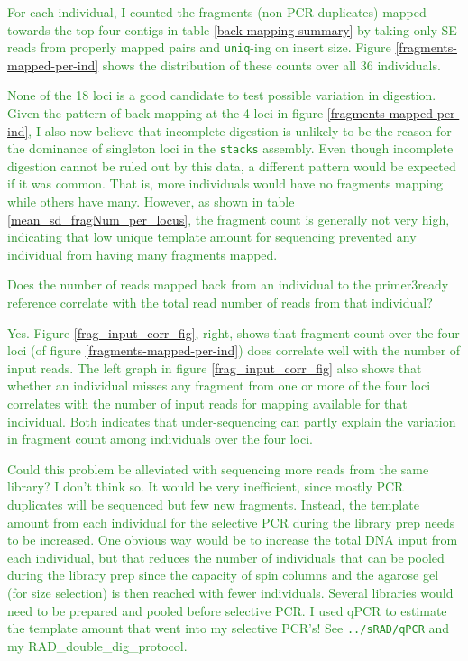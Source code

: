 \documentclass{article}\usepackage[]{graphicx}\usepackage[]{color}
\newcommand{\roger}[1]{ \textcolor[named]{ForestGreen}{#1} }
\begin{document}
\roger{For each individual, I counted the fragments (non-PCR duplicates) mapped towards the top four contigs in table \ref{back-mapping-summary} by taking only SE reads from properly mapped pairs and \texttt{uniq}-ing on insert size. Figure \ref{fragments-mapped-per-ind} shows the distribution of these counts over all 36 individuals.}

\roger{None of the 18 loci is a good candidate to test possible variation in digestion. Given the pattern of back mapping at the 4 loci in figure \ref{fragments-mapped-per-ind}, I also now believe that incomplete digestion is unlikely to be the reason for the dominance of singleton loci in the \texttt{stacks} assembly. Even though incomplete digestion cannot be ruled out by this data, a different pattern would be expected if it was common. That is, more individuals would have no fragments mapping while others have many. However, as shown in table \ref{mean_sd_fragNum_per_locus}, the fragment count is generally not very high, indicating that low unique template amount for sequencing prevented any individual from having many fragments mapped.}

\roger{Does the number of reads mapped back from an individual to the primer3ready reference correlate with the total read number of reads from that individual?}

\roger{Yes. Figure \ref{frag_input_corr_fig}, right, shows that fragment count over the four loci (of figure \ref{fragments-mapped-per-ind}) does correlate well with the number of input reads. The left graph in figure \ref{frag_input_corr_fig} also shows that whether an individual misses any fragment from one or more of the four loci correlates with the number of input reads for mapping available for that individual. Both indicates that under-sequencing can partly explain the variation in fragment count among individuals over the four loci. }

\roger{Could this problem be alleviated with sequencing more reads from the same library? I don't think so. It would be very inefficient, since mostly PCR duplicates will be sequenced but few new fragments. Instead, the template amount from each individual for the selective PCR during the library prep needs to be increased. One obvious way would be to increase the total DNA input from each individual, but that reduces the number of individuals that can be pooled during the library prep since the capacity of spin columns and the agarose gel (for size selection) is then reached with fewer individuals. Several libraries would need to be prepared and pooled before selective PCR. I used qPCR to estimate the template amount that went into my selective PCR's! See \texttt{../sRAD/qPCR} and my RAD\_double\_dig\_protocol.
}
\end{document}
